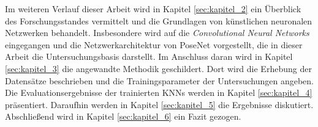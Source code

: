 Im weiteren Verlauf dieser Arbeit wird in Kapitel \ref{sec:kapitel_2} ein Überblick des Forschungsstandes vermittelt und die Grundlagen von künstlichen neuronalen Netzwerken behandelt. Insbesondere wird auf die \textit{Convolutional Neural Networks} eingegangen und die Netzwerkarchitektur von PoseNet vorgestellt, die in dieser Arbeit die Untersuchungsbasis darstellt. Im Anschluss daran wird in Kapitel \ref{sec:kapitel_3} die angewandte Methodik geschildert. Dort wird die Erhebung der Datensätze beschrieben und die Trainingsparameter der Untersuchungen angeben. Die Evaluationsergebnisse der trainierten KNNs werden in Kapitel \ref{sec:kapitel_4} präsentiert. Daraufhin werden in Kapitel \ref{sec:kapitel_5} die Ergebnisse diskutiert. Abschließend wird in Kapitel \ref{sec:kapitel_6} ein Fazit gezogen. 


